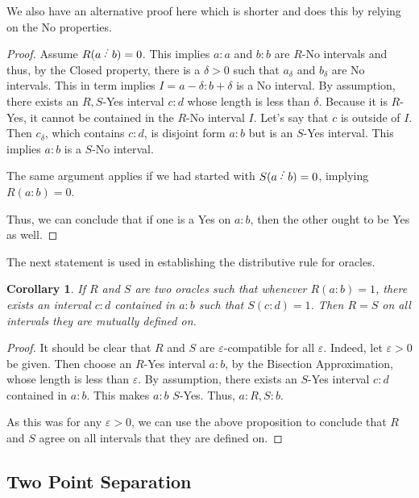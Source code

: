 \documentclass[12pt]{article}
\newtheorem{corollary}{Corollary}[subsection]
\begin{document}
We also have an alternative proof here which is shorter and does this by relying on the No properties. 

\begin{proof}
    Assume $R(a\lte b) =0$. This implies $a:a$ and $b:b$ are $R$-No intervals and thus, by the Closed property, there is a $\delta >0 $ such that $a_\delta$ and $b_\delta$ are No intervals. This in term implies $I=a-\delta:b+\delta$ is a No interval. By assumption, there exists an $R,S$-Yes interval $c:d$ whose length is less than $\delta$. Because it is $R$-Yes, it cannot be contained in the $R$-No interval $I$. Let's say that $c$ is outside of $I$. Then $c_\delta$, which contains $c:d$, is disjoint form $a:b$ but is an $S$-Yes interval. This implies $a:b$ is a $S$-No interval. 

    The same argument applies if we had started with $S(a \lte b)=0$, implying $R(a:b)=0$. 

    Thus, we can conclude that if one is a Yes on $a:b$, then the other ought to be Yes as well. 
\end{proof}


The next statement is used in establishing the distributive rule for oracles. 

\begin{corollary}
    If $R$ and $S$ are two oracles such that whenever $R(a:b) = 1$, there exists an interval $c:d$ contained in $a:b$ such that $S(c:d) = 1$. Then $R=S$ on all intervals they are mutually defined on.
\end{corollary}

\begin{proof}
It should be clear that $R$ and $S$ are $\varepsilon$-compatible for all $\varepsilon$. Indeed, let $\varepsilon >0$ be given. Then choose an $R$-Yes interval $a:b$, by the Bisection Approximation, whose length is less than $\varepsilon$. By assumption, there exists an $S$-Yes interval $c:d$ contained in $a:b$. This makes $a:b$ $S$-Yes. Thus, $a:R,S:b$. 

As this was for any $\varepsilon >0$, we can use the above proposition to conclude that $R$ and $S$ agree on all intervals that they are defined on. 
\end{proof}




\subsection{Two Point Separation}
\end{document}
